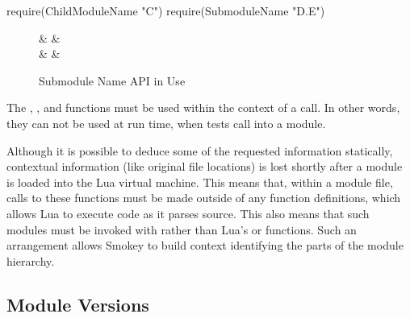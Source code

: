 \begin{lrbox}{\RightBoxB}
\begin{NestedLuaCode}[linewidth=2in]
require(ChildModuleName "C")
require(SubmoduleName "D.E")
\end{NestedLuaCode}
\end{lrbox}

\begin{lrbox}{\BoxA}
{\LstSize{}}
\end{lrbox}

\begin{lrbox}{\BoxB}
{\LstSize{}}
\end{lrbox}

\begin{figure}[h]

	\begin{LuaPorting}
		\usebox{\BoxA} & \UseLuaCodeBox{\LeftBoxA} & \UseLuaCodeBox{\RightBoxA} \\
		\usebox{\BoxB} & \UseLuaCodeBox{\LeftBoxB} & \UseLuaCodeBox{\RightBoxB} \\
	\end{LuaPorting}

	\caption{Submodule Name API in Use}
	\label{fig:SubmoduleNameExample}

\end{figure}

The , , and 
functions must be used within the context of a  call.  In
other words, they can not be used at run time, when tests call into a module.

Although it is possible to deduce some of the requested information statically,
contextual information (like original file locations) is lost shortly after a
module is loaded into the Lua virtual machine.  This means that, within a
module file, calls to these functions must be made outside of any function
definitions, which allows Lua to execute code as it parses source.  This also
means that such modules must be invoked with  rather than
Lua's  or  functions.  Such an arrangement
allows Smokey to build context identifying the parts of the module hierarchy.

\subsection{Module Versions}

